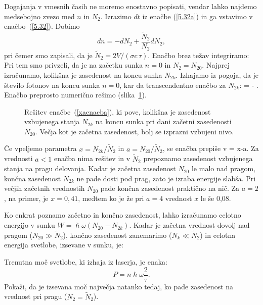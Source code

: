 Dogajanja v vmesnih časih ne moremo enostavno popisati, vendar lahko najdemo
medsebojno zvezo med $n$ in $N_2$. 
Izrazimo $dt$ iz enačbe (\ref{5.32a}) in ga vstavimo v enačbo~(\ref{5.32}).
Dobimo
\begin{equation}
dn=-dN_{2}+\frac{\tilde{N}_2}{N_{2}}dN_{2},  \label{5.341}
\end{equation}
pri čemer smo zapisali, da je $\tilde{N}_{2}=2V/(\sigma c\,\tau)$.
Enačbo brez težav integriramo:
Pri tem smo privzeli, da je na začetku sunka $n=0$ in $N_{2}=N_{20}$. 
Najprej izračunamo, kolikšna je zasedenost na koncu sunka 
$N_{2k}$. Izhajamo iz pogoja, da je število fotonov na koncu sunka $n=0$, 
kar da transcendentno enačbo za $N_{2k}$:
\beq
\ln {} = - .
\label{xaenacba}
\eeq
Enačbo preprosto numerično rešimo (slika~\ref{fig:Qeq}).

\begin{figure}[ht]
\centering
\def\svgwidth{90truemm} 

\caption{Rešitev enačbe~(\ref{xaenacba}), ki pove, kolikšna je
zasedenost vzbujenega stanja $N_{2k}$ na koncu sunka pri dani začetni 
zasedenosti $N_{20}$. Večja kot je začetna zasedenost, bolj se 
izprazni vzbujeni nivo.
}
\label{fig:Qeq}
\end{figure}

Če vpeljemo parametra $x=N_{2k}/\tilde{N}_2$ in $a=N_{20}/\tilde{N}_{2}$, se
enačba prepiše v 
\beq
\ln {}= x-a.
\eeq
Za vrednosti $a<1$ enačba nima rešitev in 
v $\tilde{N}_{2}$ prepoznamo zasedenost vzbujenega stanja na pragu delovanja. Kadar je začetna 
zasedenost $N_{20}$ le malo nad pragom, končna zasedenost $N_{2k}$ ne pade 
dosti pod prag, zato je izraba energije slabša. Pri večjih začetnih vrednostih 
$N_{20}$ pade končna zasedenost praktično na nič. Za $a=2$, na primer,
je $x=0,41$, medtem ko je že pri $a=4$ vrednost $x$ le še 0,08. 

Ko enkrat poznamo začetno in končno zasedenost, lahko izračunamo 
celotno energijo v sunku $W=\hslash \omega (N_{20}-N_{2k})$. Kadar je začetna vrednost
dovolj nad pragom ($N_{20}\gg\tilde{N}_{2}$), končno zasedenost zanemarimo ($N_{k}\ll\tilde{N}_{2}$) in 
celotna energija svetlobe, izsevane v sunku, je:
\begin{naloga}
\label{nalpmax}
Trenutna moč svetlobe, ki izhaja iz laserja, je enaka:
\begin{equation}
P=n \hslash \omega \frac{2}{\tau}.
\end{equation}
Pokaži, da je izsevana moč največja natanko tedaj, ko pade zasedenost na vrednost pri 
pragu ($N_{2}=\tilde{N}_{2}$). 
\end{naloga}

